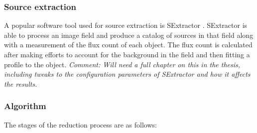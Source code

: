 \documentclass[a4paper,10pt]{article}
\begin{document}
\subsubsection{Source extraction}
A popular software tool used for source extraction is SExtractor \cite{bertin}. SExtractor is able to process an image field and produce a catalog of sources in that field along with a measurement of the flux count of each object. The flux count is calculated after making efforts to account for the background in the field and then fitting a profile to the object. \emph{Comment: Will need a full chapter on this in the thesis, including tweaks to the configuration parameters of SExtractor and how it affects the results.}

\subsubsection{Algorithm}
The stages of the reduction process are as follows:
\end{document}
